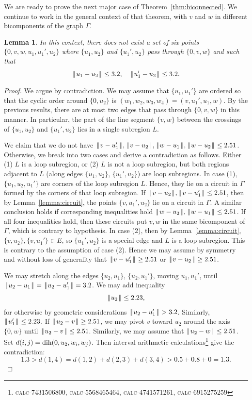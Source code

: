 \documentclass[11pt]{amsart}
\def\op#1{{\text{#1}}}
\def\text{\hbox}
\def\|{{\hskip0.1em|\hskip-0.15em|\hskip0.1em}}
\def\calc#1{{\textsc{calc-#1}}}
\newtheorem{lemma}{Lemma}
\begin{document}
We are ready to prove the next major case of Theorem~\ref{thm:biconnected}.
We continue to work in the general context of that theorem, with $v$ and $w$
in different bicomponents of the graph $\Gamma$.

\begin{lemma}\label{lemma:double-cross}  
In this context, there does not exist a set of six points $\{0,v,w,u_1,u_1',u_2\}$
where $\{u_1,u_2\}$ and $\{u_1',u_2\}$ pass through $\{0,v,w\}$ and such that
  $$\|u_1-u_2\|\le 3.2,\quad \|u_1'-u_2\|\le 3.2.$$
\end{lemma}

\begin{proof}  We argue by contradiction.  We may assume that $\{u_1,u_1'\}$ are ordered so that the cyclic order around $\{0,u_2\}$ is
$(w_1,w_2,w_3,w_4)=(v,u_1',u_1,w)$. 
By the previous results, there are at most two edges that pass through $\{0,v,w\}$
in this manner.  In particular, the part of the line segment $\{v,w\}$ between the crossings
of $\{u_1,u_2\}$ and $\{u_1',u_2\}$ lies in a single subregion $L$.  

We claim that we do not have $\|v-u_1'\|,\|v-u_2\|,\|w-u_1\|,\|w-u_2\|\le 2.51$.  Otherwise, we break
into two cases and derive a contradiction as follows.  Either (1) $L$ is a loop subregion, or (2)
$L$ is not a loop subregion, but both regions adjacent to $L$ (along edges $\{u_1,u_2\}$, $\{u_1',u_2\}$)
are loop subregions.  In case (1),
$\{u_1,u_2,u_1'\}$ are corners of the loop subregion $L$.  Hence, they lie on a circuit in $\Gamma$
formed by the corners of that loop subregion.  
If $\|v-u_2\|,\|v-u_1'\|\le 2.51$, then by Lemma~\ref{lemma:circuit}, the points
$\{v,u_1',u_2\}$ lie on a circuit in $\Gamma$.  A similar conclusion holds if corresponding inequalities
hold $\|w-u_2\|,\|w-u_1\|\le 2.51$.  If all four inequalities hold, then these circuits put $v,w$ in the
same bicomponent of $\Gamma$, which is contrary to hypothesis.  
In case (2), then by Lemma~\ref{lemma:circuit}, $\{v,u_2\},\{v,u_1'\}\in E$, so $\{u_1',u_2\}$ is a special
edge and $L$ is a loop subregion.  This is contrary to the assumption of case (2).
Hence we may assume by symmetry and without
loss of generality that $\|v-u_1'\|\ge 2.51$ or $\|v-u_2\|\ge 2.51$.

We may stretch along the edges $\{u_2,u_1\}$, $\{u_2,u_1'\}$, moving $u_1,u_1'$, 
until $\|u_2-u_1\|=\|u_2-u_1'\|=3.2$.   We may add inequality
$$
\|u_2\|\le 2.23,
$$
for otherwise by geometric considerations $\|u_2-u_1'\|> 3.2$.  Similarly, $\|u_1'\|\le 2.23$.
If $\|u_2-v\|\ge 2.51$, we may pivot $v$ toward $u_2$ around the axis $\{0,w\}$ until $\|u_2-v\|\le 2.51$.
Similarly, we may assume that $\|u_2-w\|\le 2.51$.
%
Set $d(i,j) = \op{dih}(0,u_2,w_i,w_j)$.
Then interval arithmetic calculations\footnote{\calc{7431506800}, \calc{5568465464}, \calc{4741571261}, \calc{6915275259} } give the contradiction:
$$
1.3 > d(1,4) = d(1,2) +d(2,3)+d (3,4) > 0.5 + 0.8 + 0 = 1.3.
$$
\end{proof}
\end{document}
